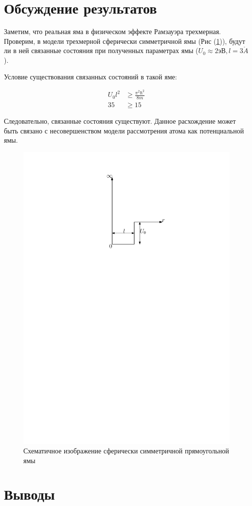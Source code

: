 \documentclass[a4paper,12pt]{article}
\begin{document}
\section*{Обсуждение результатов}

Заметим, что реальная яма в физическом эффекте Рамзауэра трехмерная. Проверим, в модели трехмерной сферически симметричной ямы (Рис (\ref{fig4:potential_well_shere})), будут ли в ней связанные состояния при полученных параметрах ямы ($U_0 \approx 2 эВ, l = 3 \mathring{A}$).

Условие существования связанных состояний в такой яме:

\begin{align*}
	U_0 l^2 &\geqslant \frac{\pi^2 \hbar^2}{8 m} \\
	35 &\geqslant 15 
\end{align*}

Следовательно, связанные состояния существуют. Данное расхождение может быть связано с несовершенством модели рассмотрения атома как потенциальной ямы.  

\begin{figure}[h!]
	\centering
	\includegraphics[width=0.5\linewidth]{fig6}
	\caption{Схематичное изображение сферически симметричной прямоугольной ямы}
	\label{fig4:potential_well_shere}
\end{figure}

\pagebreak

\section*{Выводы}
\end{document}
